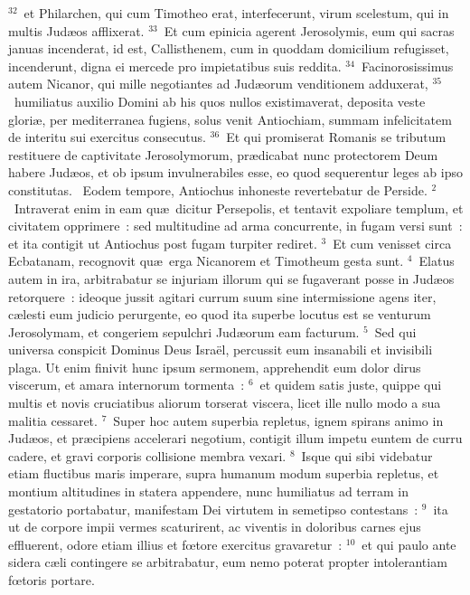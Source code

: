${}^{32}$~et Philarchen, qui cum Timotheo erat, interfecerunt, virum scelestum, qui in multis Jud\ae os afflixerat.
${}^{33}$~Et cum epinicia agerent Jerosolymis, eum qui sacras januas incenderat, id est, Callisthenem, cum in quoddam domicilium refugisset, incenderunt, digna ei mercede pro impietatibus suis reddita.
${}^{34}$~Facinorosissimus autem Nicanor, qui mille negotiantes ad Jud\ae orum venditionem adduxerat,
${}^{35}$~humiliatus auxilio Domini ab his quos nullos existimaverat, deposita veste glori\ae , per mediterranea fugiens, solus venit Antiochiam, summam infelicitatem de interitu sui exercitus consecutus.
${}^{36}$~Et qui promiserat Romanis se tributum restituere de captivitate Jerosolymorum, pr\ae dicabat nunc protectorem Deum habere Jud\ae os, et ob ipsum invulnerabiles esse, eo quod sequerentur leges ab ipso constitutas.
~\lettrine[lines=10,image=true,loversize=0.05,lraise=-0.03]{E}{}odem tempore, Antiochus inhoneste revertebatur de Perside.
${}^{2}$~Intraverat enim in eam qu\ae\ dicitur Persepolis, et tentavit expoliare templum, et civitatem opprimere~: sed multitudine ad arma concurrente, in fugam versi sunt~: et ita contigit ut Antiochus post fugam turpiter rediret.
${}^{3}$~Et cum venisset circa Ecbatanam, recognovit qu\ae\ erga Nicanorem et Timotheum gesta sunt.
${}^{4}$~Elatus autem in ira, arbitrabatur se injuriam illorum qui se fugaverant posse in Jud\ae os retorquere~: ideoque jussit agitari currum suum sine intermissione agens iter, c\ae lesti eum judicio perurgente, eo quod ita superbe locutus est se venturum Jerosolymam, et congeriem sepulchri Jud\ae orum eam facturum.
${}^{5}$~Sed qui universa conspicit Dominus Deus Isra\"el, percussit eum insanabili et invisibili plaga. Ut enim finivit hunc ipsum sermonem, apprehendit eum dolor dirus viscerum, et amara internorum tormenta~:
${}^{6}$~et quidem satis juste, quippe qui multis et novis cruciatibus aliorum torserat viscera, licet ille nullo modo a sua malitia cessaret.
${}^{7}$~Super hoc autem superbia repletus, ignem spirans animo in Jud\ae os, et pr\ae cipiens accelerari negotium, contigit illum impetu euntem de curru cadere, et gravi corporis collisione membra vexari.
${}^{8}$~Isque qui sibi videbatur etiam fluctibus maris imperare, supra humanum modum superbia repletus, et montium altitudines in statera appendere, nunc humiliatus ad terram in gestatorio portabatur, manifestam Dei virtutem in semetipso contestans~:
${}^{9}$~ita ut de corpore impii vermes scaturirent, ac viventis in doloribus carnes ejus effluerent, odore etiam illius et fœtore exercitus gravaretur~:
${}^{10}$~et qui paulo ante sidera c\ae li contingere se arbitrabatur, eum nemo poterat propter intolerantiam fœtoris portare.



